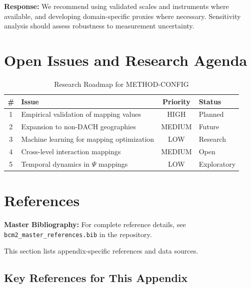 \textbf{Response:} We recommend using validated scales and instruments where
available, and developing domain-specific proxies where necessary. Sensitivity
analysis should assess robustness to measurement uncertainty.


\section{Open Issues and Research Agenda}
\label{sec:ggg-open}

\begin{table}[htbp]
\centering
\caption{Research Roadmap for METHOD-CONFIG}
\label{tab:ggg-roadmap}
\renewcommand{\arraystretch}{1.3}
\begin{tabular}{@{}clcl@{}}
\toprule
\textbf{\#} & \textbf{Issue} & \textbf{Priority} & \textbf{Status} \\
\midrule
1 & Empirical validation of mapping values & HIGH & Planned \\
2 & Expansion to non-DACH geographies & MEDIUM & Future \\
3 & Machine learning for mapping optimization & LOW & Research \\
4 & Cross-level interaction mappings & MEDIUM & Open \\
5 & Temporal dynamics in $\Psi$ mappings & LOW & Exploratory \\
\bottomrule
\end{tabular}
\end{table}


\section{References}
\label{sec:ggg-references}

\begin{tcolorbox}[colback=blue!5!white, colframe=blue!75!black]
\textbf{Master Bibliography:} For complete reference details, see
\texttt{bcm2\_master\_references.bib} in the repository.

This section lists appendix-specific references and data sources.
\end{tcolorbox}

\vspace{0.5em}

\subsection{Key References for This Appendix}

